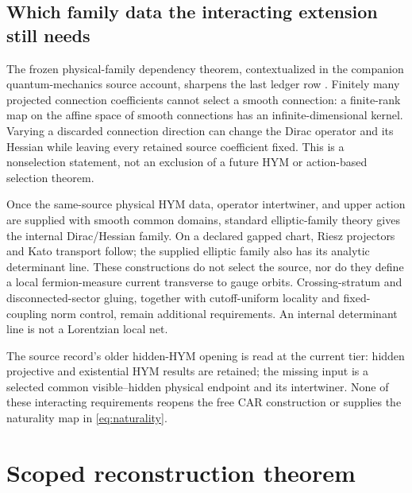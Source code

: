 \documentclass[11pt]{article}
\begin{document}
\subsection{Which family data the interacting extension still needs}
\label{sec:physical-family-consumer}

The frozen physical-family dependency theorem, contextualized in the
companion quantum-mechanics source account, sharpens the last ledger row
\cite{FrozenFamily}. Finitely many projected connection coefficients cannot
select a smooth connection: a finite-rank map on the affine space of smooth
connections has an infinite-dimensional kernel. Varying a discarded
connection direction can change the Dirac operator and its Hessian while
leaving every retained source coefficient fixed. This is a nonselection
statement, not an exclusion of a future HYM or action-based selection theorem.

Once the same-source physical HYM data, operator intertwiner, and upper
action are supplied with smooth common domains, standard elliptic-family
theory gives the internal Dirac/Hessian family. On a declared gapped chart,
Riesz projectors and Kato transport follow; the supplied elliptic family also
has its analytic determinant line. These constructions do not select the
source, nor do they define a local fermion-measure current transverse to
gauge orbits. Crossing-stratum and disconnected-sector gluing, together with
cutoff-uniform locality and fixed-coupling norm control, remain additional
requirements. An internal determinant line is not a Lorentzian local net.

The source record's older hidden-HYM opening is read at the current tier:
hidden projective and existential HYM results are retained; the missing
input is a selected common visible--hidden physical endpoint and its
intertwiner. None of these interacting requirements reopens the free CAR
construction or supplies the naturality map in \eqref{eq:naturality}.

\section{Scoped reconstruction theorem}
\end{document}
